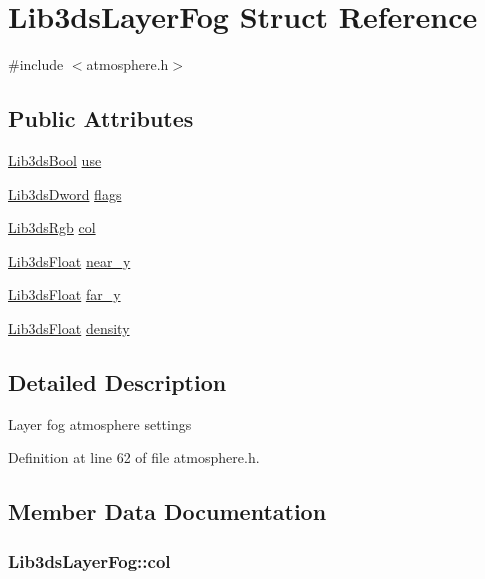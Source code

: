 \hypertarget{struct_lib3ds_layer_fog}{\section{Lib3ds\-Layer\-Fog Struct Reference}
\label{struct_lib3ds_layer_fog}
}


{\ttfamily \#include $<$atmosphere.\-h$>$}

\subsection*{Public Attributes}
\begin{DoxyCompactItemize}
\item 
\hyperlink{types_8h_a89dd7398a9ebbbf28011f8c32df67ad3}{Lib3ds\-Bool} \hyperlink{struct_lib3ds_layer_fog_aaef3366f01220676028c2c7ece753fbe}{use}
\item 
\hyperlink{types_8h_a299c9663303144c562f6bd92c2f273d3}{Lib3ds\-Dword} \hyperlink{struct_lib3ds_layer_fog_adfc8430e5a130d3ac33fc463d671f0be}{flags}
\item 
\hyperlink{types_8h_a7e320d64d2488320001f7f3b25168ee3}{Lib3ds\-Rgb} \hyperlink{struct_lib3ds_layer_fog_a77349be5be222e91b8126cfc1b37df20}{col}
\item 
\hyperlink{types_8h_ab18e70f51f9a53c9dee8d930c8e1a7bf}{Lib3ds\-Float} \hyperlink{struct_lib3ds_layer_fog_a9918459fd4d38eddcf1ac6931b7e5100}{near\-\_\-y}
\item 
\hyperlink{types_8h_ab18e70f51f9a53c9dee8d930c8e1a7bf}{Lib3ds\-Float} \hyperlink{struct_lib3ds_layer_fog_a02f64331b7ece99701bae6ef7c2b12e0}{far\-\_\-y}
\item 
\hyperlink{types_8h_ab18e70f51f9a53c9dee8d930c8e1a7bf}{Lib3ds\-Float} \hyperlink{struct_lib3ds_layer_fog_a411a3d81cb2d119cf85e99b448f9be6c}{density}
\end{DoxyCompactItemize}


\subsection{Detailed Description}
Layer fog atmosphere settings 

Definition at line 62 of file atmosphere.\-h.



\subsection{Member Data Documentation}
\hypertarget{struct_lib3ds_layer_fog_a77349be5be222e91b8126cfc1b37df20}{
\subsubsection[{col}]{ Lib3ds\-Layer\-Fog\-::col}}\label{struct_lib3ds_layer_fog_a77349be5be222e91b8126cfc1b37df20}


